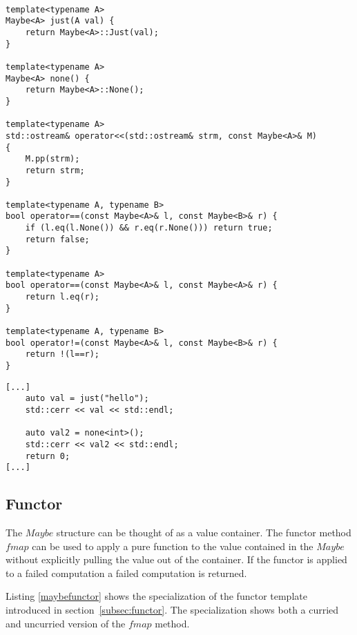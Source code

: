 \documentclass[12pt,fleqn]{article}
\begin{document}
\begin{minipage}{\linewidth}
\begin{lstlisting}[caption=auxilliary function for the Maybe class, label=maybeaux]

template<typename A>
Maybe<A> just(A val) {
	return Maybe<A>::Just(val);
}

template<typename A>
Maybe<A> none() {
	return Maybe<A>::None();
}

template<typename A>
std::ostream& operator<<(std::ostream& strm, const Maybe<A>& M) 
{
	M.pp(strm);
	return strm;
}

template<typename A, typename B>
bool operator==(const Maybe<A>& l, const Maybe<B>& r) {
	if (l.eq(l.None()) && r.eq(r.None())) return true;
	return false;
}

template<typename A>
bool operator==(const Maybe<A>& l, const Maybe<A>& r) {
	return l.eq(r);
}

template<typename A, typename B>
bool operator!=(const Maybe<A>& l, const Maybe<B>& r) {
	return !(l==r);
}

\end{lstlisting}
\end{minipage}

%
%
%

%
%

\begin{minipage}{\linewidth}
\begin{lstlisting}[caption=Example of the use of Maybe, label=maybeexample]
[...]
	auto val = just("hello");
	std::cerr << val << std::endl;

	auto val2 = none<int>();
	std::cerr << val2 << std::endl;
	return 0;
[...]
\end{lstlisting}
\end{minipage}

%
%
\subsection{Functor}
%
%

The $Maybe$ structure can be thought of as a value container.
The functor method $fmap$ can be used to apply a pure function to the value contained in the $Maybe$ 
without explicitly pulling the value out of the container.
If the functor is applied to a failed computation a failed computation is returned.

Listing \ref{maybefunctor} shows the specialization of the functor template introduced in section~\ref{subsec:functor}.
The specialization shows both a curried and uncurried version of the $fmap$ method.
\end{document}
